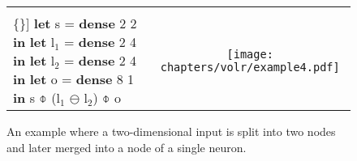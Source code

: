 \begin{figure}
  \begin{tabular}[t]{l c}
    \begin{minipage}{0.45\textwidth}
      \begin{Verbatim}[mathescape,commandchars=\\\{\}]
\textbf{let} s = \textbf{dense} 2 2 \textbf{in}
\textbf{let} l$_1$ = \textbf{dense} 2 4 \textbf{in}
\textbf{let} l$_2$ = \textbf{dense} 2 4 \textbf{in}
\textbf{let} o = \textbf{dense} 8 1 \textbf{in} 
  s $\obar$ (l$_1$ $\ominus$ l$_2$) $\obar$ o
      \end{Verbatim}
    \end{minipage} & \begin{minipage}{0.5\textwidth}
       \texttt{[image: chapters/volr/example4.pdf]}
    \end{minipage}
  \end{tabular}
   \caption{An example where a two-dimensional input is split into
     two nodes and later merged into a node of a single neuron.}
  \label{fig:volr-examples}
\end{figure}
